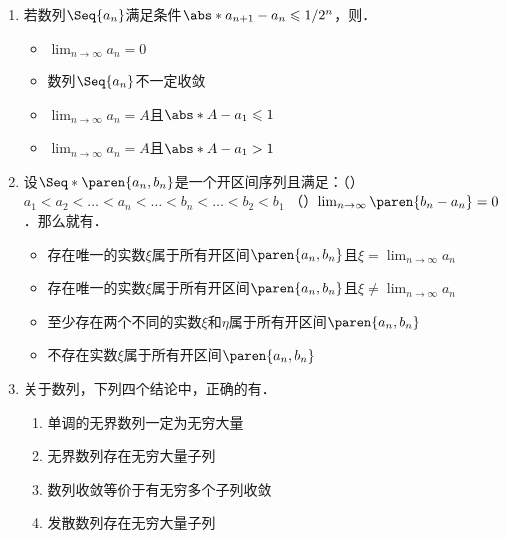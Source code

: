 \documentclass[a4paper,punct=CCT]{ctexbook}
\renewcommand*{\enumparen}[1]{（\makebox[0.6em][c]{\normalfont#1}）}
\theoremstyle{definition}
\theoremstyle{remark}
\newif\ifshowsol
\let\leq\leqslant
\let\le\leq
\begin{document}
\begin{enumerate}
\item 若数列\(\Seq{a_n}\)满足条件\(\abs*{a_{n+1} - a_n} \le 1/2^n\)，则\uline{\makebox[6em]{}}．
  \begin{itemize}
    \renewcommand{\labelitemi}{\faCircleThin}
  \item \(\lim_{n\to\infty} a_n = 0\)
  \item 数列\(\Seq{a_n}\)不一定收敛
    \ifshowsol
  \item[\faCircle]
    \else
  \item
    \fi
    \(\lim_{n\to\infty} a_n = A\)且\(\abs*{A - a_1} \le 1\)
  \item \(\lim_{n\to\infty} a_n = A\)且\(\abs*{A - a_1} > 1\)
  \end{itemize}

  \ifshowsol
  选项~A可以有反例\(a_n = 1\)来说明．选项~B可以由三角不等式推出这个数列是柯西列，进而收敛．选项~C可以先推出\(\abs*{a_n - a_1} \le 1 - 1/2^{n-1}\)，然后用反证法说明\(\abs*{A - a_1} \ngtr 1\)．
  \fi

\item 设\(\Seq*{\paren{a_n, b_n}}\)是一个开区间序列且满足：\enumparen{1}\(a_1 < a_2 < \dots < a_n < \dots < b_n < \dots < b_2 < b_1\) \enumparen{2}\(\lim_{n\to\infty} \paren{b_n - a_n} = 0\)．那么就有\uline{\makebox[10em]{}}．
  \begin{itemize}
    \renewcommand{\labelitemi}{\faCircleThin}
    \ifshowsol
  \item[\faCircle]
    \else
  \item
    \fi
    存在唯一的实数\(ξ\)属于所有开区间\(\paren{a_n, b_n}\)且\(ξ = \lim_{n\to\infty} a_n\)
  \item 存在唯一的实数\(ξ\)属于所有开区间\(\paren{a_n, b_n}\)且\(ξ \ne \lim_{n\to\infty} a_n\)
  \item 至少存在两个不同的实数\(ξ\)和\(η\)属于所有开区间\(\paren{a_n, b_n}\)
  \item 不存在实数\(ξ\)属于所有开区间\(\paren{a_n, b_n}\)
  \end{itemize}

  \ifshowsol
  可以参考区间套定理的证明方式．
  \fi

\item 关于数列，下列四个结论中，正确的有\uline{\makebox[6em]{%
      \ifshowsol
      \enumparen{1}%
      \enumparen{2}
      \fi}}．
  \begin{enumerate}
    \renewcommand{\labelenumii}{\enumparen{\arabic{enumii}}}
  \item 单调的无界数列一定为无穷大量
  \item 无界数列存在无穷大量子列
  \item 数列收敛等价于有无穷多个子列收敛
  \item 发散数列存在无穷大量子列
  \end{enumerate}


\end{enumerate}
\end{document}
